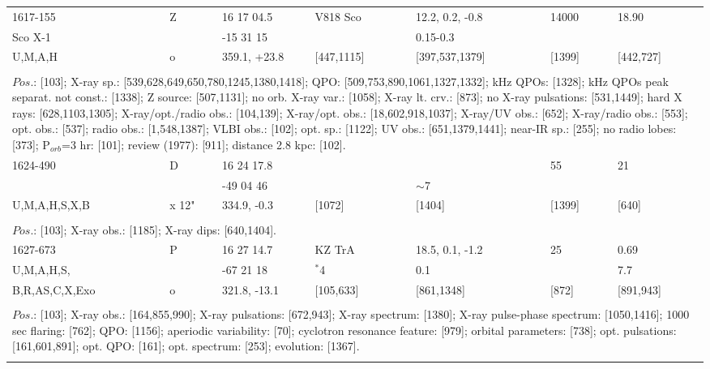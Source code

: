 \documentclass{aa}
\begin{document}
\begin{tabular}{p{2.5cm}p{1cm}p{1.8cm}p{2.3cm}p{3.3cm}p{2.0cm}p{2.2cm}}
\noalign{\smallskip}
1617-155         & Z          & 16 17 04.5       & V818 Sco      & 12.2, 0.2, -0.8               & 14000      & 18.90          \\
Sco X-1           &              & -15 31 15         &                         & 0.15-0.3                        &                   &                     \\
U,M,A,H          & o           & 359.1, +23.8   & [447,1115]     & [397,537,1379]            & [1399]      & [442,727]   \\
\\
\multicolumn{7}{p{17.5cm}}{
$Pos$.: [103]; X-ray sp.: [539,628,649,650,780,1245,1380,1418]; QPO: [509,753,890,1061,1327,1332]; kHz QPOs: [1328]; 
kHz QPOs peak separat. not const.: [1338]; Z source: [507,1131]; no orb. X-ray var.: [1058]; X-ray lt. crv.: [873]; 
no X-ray pulsations: [531,1449]; hard X rays: [628,1103,1305]; X-ray/opt./radio obs.: [104,139]; X-ray/opt. obs.: 
[18,602,918,1037]; X-ray/UV obs.: [652]; X-ray/radio obs.: [553]; opt. obs.: [537]; radio obs.: [1,548,1387]; VLBI obs.: 
[102]; opt. sp.: [1122]; UV obs.: [651,1379,1441]; near-IR sp.: [255]; no radio lobes: [373]; P$_{orb}$=3 hr: [101]; 
review (1977): [911]; distance 2.8 kpc: [102].}\\
\noalign{\smallskip}
\hline

\noalign{\smallskip}
1624-490             & D         & 16 24 17.8      &                   &                    & 55           & 21       \\
                              &             & -49 04 46        &                   & $\sim$7     &                 &             \\
U,M,A,H,S,X,B   & x 12"   & 334.9, -0.3      & [1072]       & [1404]        & [1399]    & [640]   \\
\\
\multicolumn{7}{p{17.5cm}}{
$Pos$.: [103]; X-ray obs.: [1185]; X-ray dips: [640,1404].}\\
\noalign{\smallskip}
\hline

\noalign{\smallskip}
1627-673                 & P          & 16 27 14.7      & KZ TrA             & 18.5, 0.1, -1.2           & 25             & 0.69     \\
 U,M,A,H,S,             &              & -67 21 18        & $^*$4                & 0.1                              &                  & 7.7      \\
B,R,AS,C,X,Exo    & o          & 321.8, -13.1    & [105,633]          & [861,1348]                & [872]        & [891,943]        \\
\\
\multicolumn{7}{p{17.5cm}}{
$Pos$.: [103]; X-ray obs.: [164,855,990]; X-ray pulsations: [672,943]; X-ray spectrum: [1380]; X-ray pulse-phase 
spectrum: [1050,1416]; 1000 sec flaring: [762]; QPO: [1156]; aperiodic variability: [70]; cyclotron resonance 
feature: [979]; orbital parameters: [738]; opt. pulsations: [161,601,891]; opt. QPO: [161]; opt. spectrum: [253]; 
evolution: [1367].}\\
\noalign{\smallskip}
\hline

\end{tabular}
\end{document}
